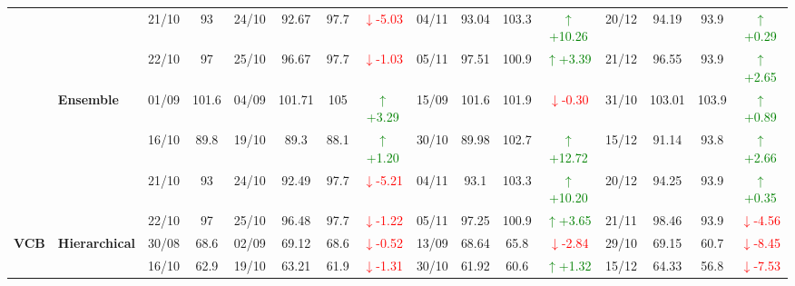 {\begin{longtable}{llcc|cccc|cccc|cccc}
&
& 21/10 & 93 & 24/10 & 92.67 & 97.7 & \textcolor{red}{\(\downarrow\)-5.03} & 04/11 & 93.04 & 103.3 & \textcolor{green}{\(\uparrow\)+10.26} & 20/12 & 94.19 & 93.9 & \textcolor{green}{\(\uparrow\)+0.29} \\

&
& 22/10 & 97 & 25/10 & 96.67 & 97.7 & \textcolor{red}{\(\downarrow\)-1.03} & 05/11 & 97.51 & 100.9 & \textcolor{green}{\(\uparrow\)+3.39} & 21/12 & 96.55 & 93.9 & \textcolor{green}{\(\uparrow\)+2.65} \\
\cmidrule(lr){2-16}



& \textbf{Ensemble}
& 01/09 & 101.6 & 04/09 & 101.71 & 105 & \textcolor{green}{\(\uparrow\)+3.29} & 15/09 & 101.6 & 101.9 & \textcolor{red}{\(\downarrow\)-0.30} & 31/10 & 103.01 & 103.9 & \textcolor{green}{\(\uparrow\)+0.89} \\

&
& 16/10 & 89.8 & 19/10 & 89.3 & 88.1 & \textcolor{green}{\(\uparrow\)+1.20} & 30/10 & 89.98 & 102.7 & \textcolor{green}{\(\uparrow\)+12.72} & 15/12 & 91.14 & 93.8 & \textcolor{green}{\(\uparrow\)+2.66} \\

&
& 21/10 & 93 & 24/10 & 92.49 & 97.7 & \textcolor{red}{\(\downarrow\)-5.21} & 04/11 & 93.1 & 103.3 & \textcolor{green}{\(\uparrow\)+10.20} & 20/12 & 94.25 & 93.9 & \textcolor{green}{\(\uparrow\)+0.35} \\

&
& 22/10 & 97 & 25/10 & 96.48 & 97.7 & \textcolor{red}{\(\downarrow\)-1.22} & 05/11 & 97.25 & 100.9 & \textcolor{green}{\(\uparrow\)+3.65} & 21/11 & 98.46 & 93.9 & \textcolor{red}{\(\downarrow\)-4.56} \\
\midrule




\multirow{12}{*}{\textbf{VCB}} 
& \textbf{Hierarchical}
& 30/08 & 68.6 & 02/09 & 69.12 & 68.6 & \textcolor{red}{\(\downarrow\)-0.52} & 13/09 & 68.64 & 65.8 & \textcolor{red}{\(\downarrow\)-2.84} & 29/10 & 69.15 & 60.7 & \textcolor{red}{\(\downarrow\)-8.45} \\

&
& 16/10 & 62.9 & 19/10 & 63.21 & 61.9 & \textcolor{red}{\(\downarrow\)-1.31} & 30/10 & 61.92 & 60.6 & \textcolor{green}{\(\uparrow\)+1.32} & 15/12 & 64.33 & 56.8 & \textcolor{red}{\(\downarrow\)-7.53} \\


\end{longtable}}
